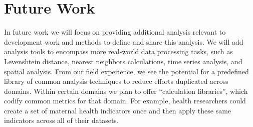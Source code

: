 \documentclass{sig-alternate}
\begin{document}
\section{Future Work}
In future work we will focus on providing additional analysis relevant to
development work and methods to define and share this analysis.
We will add analysis tools to encompass more
real-world data processing tasks, such as Levenshtein distance, nearest
neighbors calculations, time series analysis, and spatial analysis.
From our field experience, we see the potential for a predefined library of common analysis techniques to reduce
efforts duplicated across domains.
Within certain domains we plan to offer ``calculation libraries'',
which codify common metrics for that domain.  For example, health researchers could
create a set of maternal health indicators once and then apply these same
indicators across all of their datasets.


%

\small{
}
%
%

\balancecolumns
\end{document}
